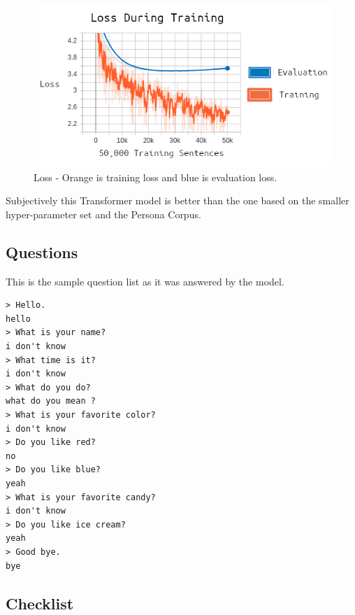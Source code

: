 \begin{figure}[H]
	\begin{center}
		\includegraphics[scale=3.5]{diagram-chart-loss-00}
		
		
	\end{center}
	\caption[Loss - Larger Transformer Model]{Loss - Orange is training loss and blue is evaluation loss.}
	
\end{figure}

Subjectively this Transformer model is better than the one based on the smaller hyper-parameter set and the Persona Corpus.


\subsection{Questions}
This is the sample question list as it was answered by the model.

\begin{verbatim}
> Hello.
hello 
> What is your name?
i don't know 
> What time is it?
i don't know 
> What do you do?
what do you mean ?
> What is your favorite color?
i don't know 
> Do you like red?
no 
> Do you like blue?
yeah 
> What is your favorite candy?
i don't know 
> Do you like ice cream?
yeah 
> Good bye.
bye 
\end{verbatim}

\subsection{Checklist}

